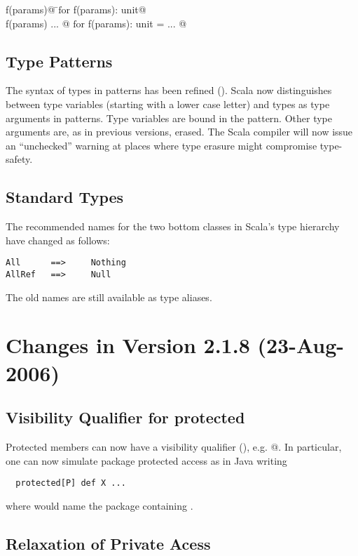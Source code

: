 \begin{tabbing}
\lstinline@def f(params)@     \tab\tab\tab \=$\mbox{for}$  \tab
\lstinline@def f(params): unit@ \\
\lstinline@def f(params) { ... }@  \>$\mbox{for}$    \tab
\lstinline@def f(params): unit = { ... }@
\end{tabbing}

\subsection*{Type Patterns} The syntax of types in patterns has been 
refined (). Scala now distinguishes between
type variables (starting with a lower case letter) and types as type
arguments in patterns.  Type variables are bound in the pattern. Other
type arguments are, as in previous versions, erased. The Scala
compiler will now issue an ``unchecked'' warning at places where type
erasure might compromise type-safety.

\subsection*{Standard Types} 

The recommended names for the two bottom classes in Scala's type
hierarchy have changed as follows:
\begin{lstlisting}
All      ==>     Nothing
AllRef   ==>     Null
\end{lstlisting}
The old names are still available as type aliases.

\section*{Changes in Version 2.1.8 (23-Aug-2006)}

\subsection*{Visibility Qualifier for protected}

Protected members can now have a visibility qualifier (),
e.g. \lstinline@protected[<qualifier>]@. In particular, one can now
simulate package protected access as in Java writing
\begin{lstlisting}
  protected[P] def X ...
\end{lstlisting}
where  would name the package containing .

\subsection*{Relaxation of Private Acess}


